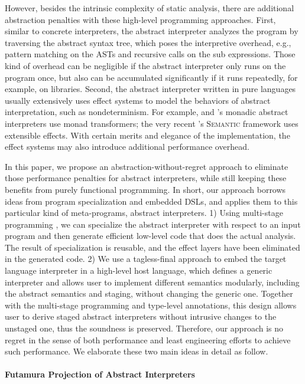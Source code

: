 However, besides the intrinsic complexity of static analysis, there are
additional abstraction penalties with these high-level programming approaches.
First, similar to concrete interpreters, the abstract interpreter analyzes the
program by traversing the abstract syntax tree, which poses the interpretive
overhead, e.g., pattern matching on the ASTs and recursive calls on the sub
expressions. Those kind of overhead can be negligible if the abstract
interpreter only runs on the program once, but also can be accumulated
significantly if it runs repeatedly, for example, on libraries. Second, the
abstract interpreter written in pure languages usually extensively uses effect
systems to model the behaviors of abstract interpretation, such as
nondeterminism. For example, \citet{DBLP:journals/pacmpl/DaraisLNH17} and
\citet{Sergey:2013:MAI:2491956.2491979}'s monadic abstract interpreters use
monad transformers; the very recent \citet{Githubsemantic}'s \textsc{Semantic} framework
uses extensible effects. With certain merits and elegance of the implementation,
the effect systems may also introduce additional performance overhead.

In this paper, we propose an abstraction-without-regret approach to
eliminate those performance penalties for abstract interpreters, while
still keeping these benefits from purely functional programming.  In
short, our approach borrows ideas from program specialization and
embedded DSLs, and applies them to this particular kind of
meta-programs, abstract interpreters.  1) Using multi-stage
programming , we can specialize the
abstract interpreter with respect to an input program and then
generate efficient low-level code that does the actual analysis. The
result of specialization is reusable, and the effect layers have been
eliminated in the generated code. 2) We use a tagless-final approach
to embed the target language interpreter in a high-level host language,
which defines a generic interpreter and allows user to
implement different semantics modularly, including the abstract
semantics and staging, without changing the generic one.
Together with the multi-stage programming and type-level
annotations, this design allows user to derive staged abstract
interpreters without intrusive changes to the unstaged one, thus the soundness is preserved. 
Therefore, our approach is no regret in the sense of both performance and least
engineering efforts to achieve such performance. We elaborate these
two main ideas in detail as follow.

\paragraph{Futamura Projection of Abstract Interpreters}

